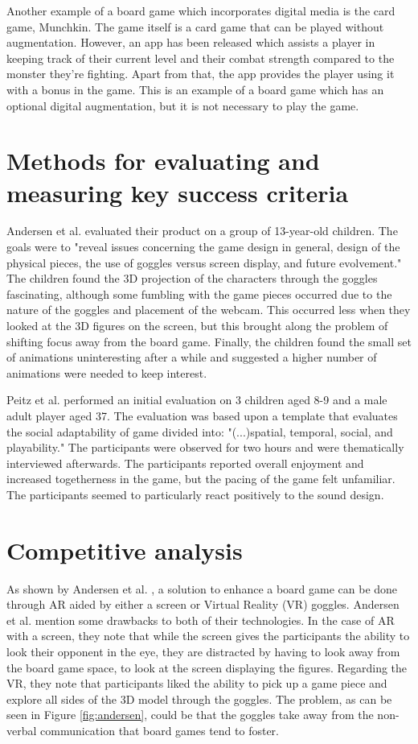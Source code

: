 Another example of a board game which incorporates digital media is the card game, Munchkin. The game itself is a card game that can be played without augmentation. However, an app \citep{Munchkin} has been released which assists a player in keeping track of their current level and their combat strength compared to the monster they're fighting. Apart from that, the app provides the player using it with a bonus in the game. This is an example of a board game which has an optional digital augmentation, but it is not necessary to play the game.

\section{Methods for evaluating and measuring key success criteria}
Andersen et al. \citep{andersen_designing_2004} evaluated their product on a group of 13-year-old children. The goals were to "reveal issues concerning the game design in general, design of the physical pieces, the use of goggles versus screen display, and future evolvement." The children found the 3D projection of the characters through the goggles fascinating, although some fumbling with the game pieces occurred due to the nature of the goggles and placement of the webcam. This occurred less when they looked at the 3D figures on the screen, but this brought along the problem of shifting focus away from the board game.
Finally, the children found the small set of animations uninteresting after a while and suggested a higher number of animations were needed to keep interest.

Peitz et al. \citep{peitzWizards2006} performed an initial evaluation on 3 children aged 8-9 and a male adult player aged 37. The evaluation was based upon a template that evaluates the social adaptability of game divided into: "(...)spatial, temporal, social, and playability." The participants were observed for two hours and were thematically interviewed afterwards. The participants reported overall enjoyment and increased togetherness in the game, but the pacing of the game felt unfamiliar. The participants seemed to particularly react positively to the sound design. 

\section{Competitive analysis}
As shown by Andersen et al. \citep{andersen_designing_2004}, a solution to enhance a board game can be done through AR aided by either a screen or Virtual Reality (VR) goggles. Andersen et al. mention some drawbacks to both of their technologies. In the case of AR with a screen, they note that while the screen gives the participants the ability to look their opponent in the eye, they are distracted by having to look away from the board game space, to look at the screen displaying the figures. Regarding the VR, they note that participants liked the ability to pick up a game piece and explore all sides of the 3D model through the goggles. The problem, as can be seen in Figure \ref{fig:andersen}, could be that the goggles take away from the non-verbal communication that board games tend to foster.

